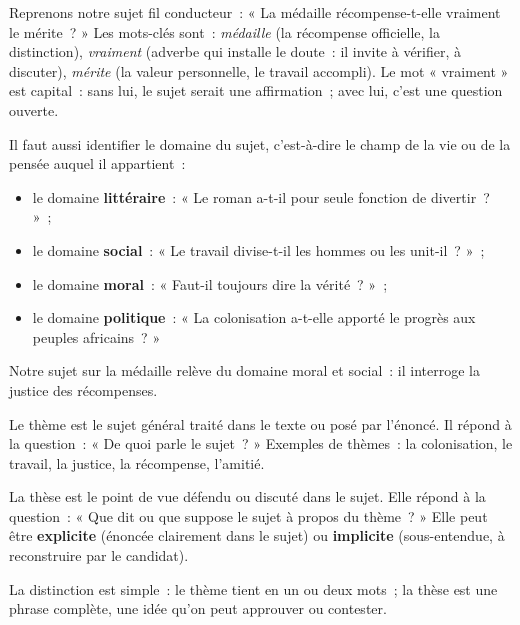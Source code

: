 \documentclass[11pt]{article}
\newcommand{\cle}[1]{{\popxbold\color{popdark}#1}}
\newcounter{popsec}
\newcounter{popsub}
\newcommand{\courssub}[1]{%
  \stepcounter{popsub}%
  \par\vspace{9pt}\noindent{\popxbold\fontsize{11.5}{13}\selectfont\color{popink}{\color{poporange}\thepopsec.\thepopsub}\hspace{6pt}#1}\par\nopagebreak\vspace{4pt}
}
\begin{document}
Reprenons notre sujet fil conducteur~: « La médaille récompense-t-elle vraiment le mérite~? » Les mots-clés sont~: \emph{médaille} (la récompense officielle, la distinction), \emph{vraiment} (adverbe qui installe le doute~: il invite à vérifier, à discuter), \emph{mérite} (la valeur personnelle, le travail accompli). Le mot « vraiment » est capital~: sans lui, le sujet serait une affirmation~; avec lui, c'est une question ouverte.

Il faut aussi identifier le \cle{domaine} du sujet, c'est-à-dire le champ de la vie ou de la pensée auquel il appartient~:

\begin{itemize}
\item le domaine \textbf{littéraire}~: « Le roman a-t-il pour seule fonction de divertir~? »~;
\item le domaine \textbf{social}~: « Le travail divise-t-il les hommes ou les unit-il~? »~;
\item le domaine \textbf{moral}~: « Faut-il toujours dire la vérité~? »~;
\item le domaine \textbf{politique}~: « La colonisation a-t-elle apporté le progrès aux peuples africains~? »
\end{itemize}

Notre sujet sur la médaille relève du domaine moral et social~: il interroge la justice des récompenses.

\courssub{Dégager le thème et la thèse}

\begin{definition}[Le thème]
Le \cle{thème} est le sujet général traité dans le texte ou posé par l'énoncé. Il répond à la question~: « De quoi parle le sujet~? » Exemples de thèmes~: la colonisation, le travail, la justice, la récompense, l'amitié.
\end{definition}

\begin{definition}[La thèse]
La \cle{thèse} est le point de vue défendu ou discuté dans le sujet. Elle répond à la question~: « Que dit ou que suppose le sujet à propos du thème~? » Elle peut être \textbf{explicite} (énoncée clairement dans le sujet) ou \textbf{implicite} (sous-entendue, à reconstruire par le candidat).
\end{definition}

La distinction est simple~: le thème tient en un ou deux mots~; la thèse est une phrase complète, une idée qu'on peut approuver ou contester.
\end{document}
